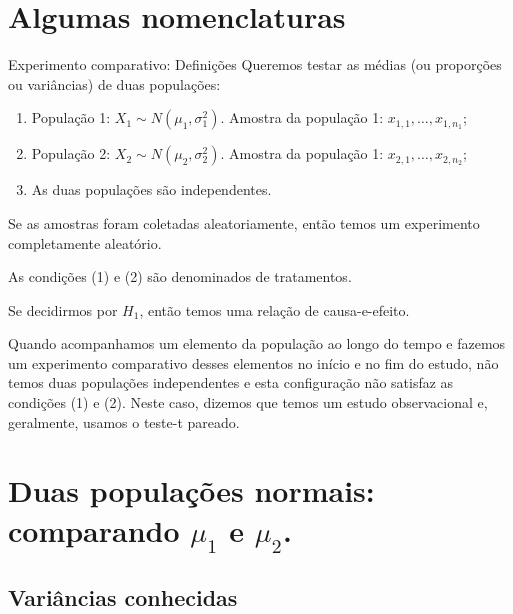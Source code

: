 \documentclass[9pt]{beamer}
\begin{document}
\section{Algumas nomenclaturas}

\begin{frame}{Experimento comparativo: Definições}
Queremos testar as médias (ou proporções ou variâncias) de duas populações:
\begin{enumerate}[(1)]
	\item População 1: $X_1 \sim N(\mu_1, \sigma_1^2)$. Amostra da população 1: $x_{1,1}, \dots, x_{1,n_1}$;
	\item População 2: $X_2 \sim N(\mu_2, \sigma_2^2)$. Amostra da população 1: $x_{2,1}, \dots, x_{2,n_2}$;
	\item As duas populações são independentes.
\end{enumerate}
\vfill

Se as amostras foram coletadas aleatoriamente, então temos um \textcolor{important}{experimento completamente aleatório}.
\vfill

As condições (1) e (2) são denominados de tratamentos.
\vfill

Se decidirmos por $H_1$, então temos uma relação de \textcolor{important}{causa-e-efeito}.
\vfill

Quando acompanhamos um elemento da população ao longo do tempo e fazemos um experimento comparativo desses elementos no início e no fim do estudo, não temos duas populações independentes e esta configuração não satisfaz as condições (1) e (2). Neste caso, dizemos que temos um \textcolor{important}{estudo observacional} e, geralmente, usamos o teste-t pareado.
\end{frame}

\section{Duas populações normais: comparando $\mu_1$ e $\mu_2$.}

\subsection{Variâncias conhecidas}
\end{document}
